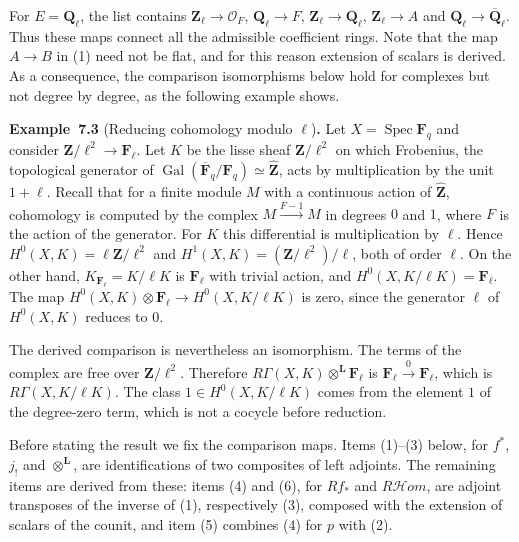 \documentclass[11pt]{article}
\newenvironment{bpstatement}[2]{\par\addvspace{0.6\baselineskip}\noindent\textbf{#1}#2\textbf{.}\enspace\ignorespaces}
  {\par\addvspace{0.4\baselineskip}}
\providecommand{\cHom}{}\renewcommand{\cHom}{R\mathcal{H}\!om}
\begin{document}
For \(E=\mathbf Q_\ell\), the list contains \(\mathbf Z_\ell\to\mathcal O_F\), \(\mathbf Q_\ell\to F\), \(\mathbf Z_\ell\to\mathbf Q_\ell\), \(\mathbf Z_\ell\to A\) and \(\mathbf Q_\ell\to\overline{\mathbf Q}_\ell\). Thus these maps connect all the admissible coefficient rings. Note that the map \(A\to B\) in (1) need not be flat, and for this reason extension of scalars is derived. As a consequence, the comparison isomorphisms below hold for complexes but not degree by degree, as the following example shows.

\label{bp10}%
\begin{bpstatement}{Example~7.3}{ (Reducing cohomology modulo $\ell$)}
Let \(X=\operatorname{Spec}\mathbf F_q\) and consider \(\mathbf Z/\ell^2\to\mathbf F_\ell\). Let \(K\) be the lisse sheaf \(\mathbf Z/\ell^2\) on which Frobenius, the topological generator of \(\operatorname{Gal}(\overline{\mathbf F}_q/\mathbf F_q)
\simeq\widehat{\mathbf Z}\), acts by multiplication by the unit \(1+\ell\). Recall that for a finite module \(M\) with a continuous action of \(\widehat{\mathbf Z}\), cohomology is computed by the complex \(M\xrightarrow{F-1}M\) in degrees \(0\) and \(1\), where \(F\) is the action of the generator. For \(K\) this differential is multiplication by \(\ell\). Hence \(H^0(X,K)=\ell\mathbf Z/\ell^2\) and \(H^1(X,K)=(\mathbf Z/\ell^2)/\ell\), both of order \(\ell\). On the other hand, \(K_{\mathbf F_\ell}=K/\ell K\) is \(\mathbf F_\ell\) with trivial action, and \(H^0(X,K/\ell K)=\mathbf F_\ell\). The map \(H^0(X,K)\otimes\mathbf F_\ell\to H^0(X,K/\ell K)\) is zero, since the generator \(\ell\) of \(H^0(X,K)\) reduces to \(0\).

The derived comparison is nevertheless an isomorphism. The terms of the complex are free over \(\mathbf Z/\ell^2\). Therefore \(R\Gamma(X,K)\otimes^{\mathbf L}\mathbf F_\ell\) is \(\mathbf F_\ell\xrightarrow{0}\mathbf F_\ell\), which is \(R\Gamma(X,K/\ell K)\). The class \(1\in H^0(X,K/\ell K)\) comes from the element \(1\) of the degree-zero term, which is not a cocycle before reduction.
\end{bpstatement}

\label{bp11}%
Before stating the result we fix the comparison maps. Items (1)–(3) below, for \(f^*\), \(j_!\) and \(\otimes^{\mathbf L}\), are identifications of two composites of left adjoints. The remaining items are derived from these: items (4) and (6), for \(Rf_*\) and \(\cHom\), are adjoint transposes of the inverse of (1), respectively (3), composed with the extension of scalars of the counit, and item (5) combines (4) for \(p\) with (2).
\end{document}
